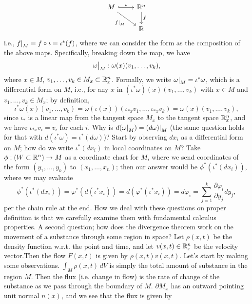 \[ \begin{tikzcd}
    M \arrow[rd, "\restr{f}{M}"'] \arrow[r, hookrightarrow, "\iota"] & \RR^n \arrow[d, "f"] \\
    & \RR
\end{tikzcd} \]
i.e., $\restr{f}{M} = f \circ \iota = \iota^\ast(f)$, where we can consider the form as the composition of the above maps. Specifically, breaking down the map, we have
\[ \restr{\omega}{M} : \omega(x)(v_1, \dots, v_k), \]
where $x \in M$, $v_1, \dots, v_k \in M_x \subset \mathbb R^n_x$. Formally, we write $\restr{\omega}{M} = \iota^\ast \omega$, which is a differential form on $M$, i.e., for any $x$ in $(\iota^\ast \omega)(x)(v_1, \dots, v_k)$ with $x \in M$ and $v_1, \dots, v_k \in M_x$; by definition,
\[ \iota^\ast \omega (x) (v_1, \dots, v_k) = \omega(\iota(x)) (\iota_{\ast x} v_1, \dots, \iota_{\ast x} v_k) = \omega(x)(v_1, \dots, v_k), \]
since $\iota_\ast$ is a linear map from the tangent space $M_x$ to the tangent space $\mathbb R^n_x$, and we have $\iota_{\ast x} v_i = v_i$ for each $i$. Why is $d(\restr{\omega}{M}) = \restr{(d\omega)}{M}$ (the same question holds for that with $d(\iota^\ast \omega) = \iota^\ast (d\omega)$)? Start by observing $dx_i$ as a differential form on $M$; how do we write $\iota^\ast (dx_i)$ in local coordinates on $M$? Take $\phi : (W \subset \mathbb R^n) \to M$ as a coordinate chart for $M$, where we send coordinates of the form $(y_1, \dots, y_k)$ to $(x_1, \dots, x_n)$; then our answer would be $\phi^\ast(\iota^\ast(dx_i))$, where we may evaluate
\[ \phi^\ast(\iota^\ast(dx_i)) = \varphi^\ast(d(\iota^\ast x_i)) = d(\varphi^\ast(\iota^\ast x_i)) = d\varphi_i = \sum_{j=1}^k \frac{\partial \varphi_i}{\partial y_j} dy_j, \]
per the chain rule at the end. How we deal with these questions on proper definition is that we carefully examine them with fundamental calculus properties.
\medskip\newline
A second question; how does the divergence theorem work on the movement of a substance through some region in space? Let $\rho(x, t)$ be the density function w.r.t. the point and time, and let $v(x, t) \in \mathbb R^n_x$ be the velocity vector.Then the flow $F(x, t)$ is given by $\rho(x, t) v(x, t)$.
\medskip\newline
Let's start by making some observations. $\int_M \rho(x, t) \, dV$ is simply the total amount of substance in the region $M$. Then the flux (i.e. change in flow) is the rate of change of the substance as we pass through the boundary of $M$. $\partial M_x$ has an outward pointing unit normal $n(x)$, and we see that the flux is given by

